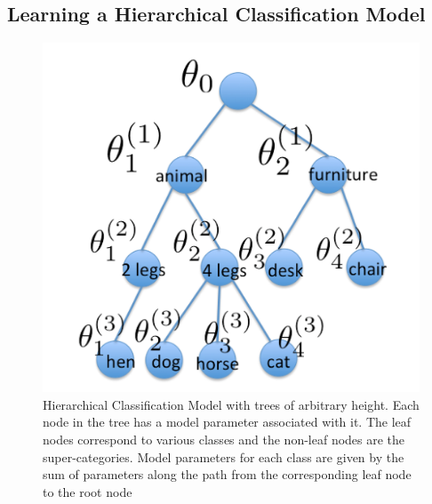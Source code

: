 \documentclass[10pt,twocolumn,letterpaper]{article}
\begin{document}
\subsection{Learning a Hierarchical Classification Model}

\begin{figure}[t]
 	\begin{center}
 		\includegraphics[width=0.8\linewidth]{tree_withoutnew.png}
 	\end{center}
 	\caption{Hierarchical Classification Model with trees of arbitrary height.
 	         Each node in the tree has a model parameter associated with it.
 	         The leaf nodes correspond to various classes and the non-leaf nodes
 	         are the super-categories. Model parameters for each class
 	         are given by the sum of parameters along the path from the 
 	         corresponding leaf node to the root node}
 	\label{fig:hier-tree-intro}
 \end{figure}
\end{document}

